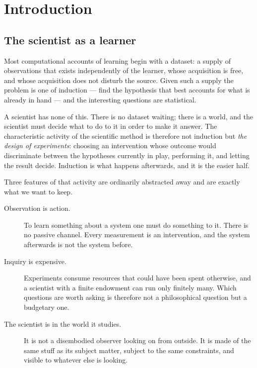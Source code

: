 \bigskip

\section{Introduction}\label{sci:S1}

\subsection{The scientist as a learner}\label{sci:S1.1}

Most computational accounts of learning begin with a dataset: a supply of observations that exists
independently of the learner, whose acquisition is free, and whose acquisition does not disturb the
source. Given such a supply the problem is one of induction --- find the hypothesis that best accounts
for what is already in hand --- and the interesting questions are statistical.

A scientist has none of this. There is no dataset waiting; there is a world, and the scientist must
decide what to do to it in order to make it answer. The characteristic activity of the scientific
method is therefore not induction but \emph{the design of experiments}: choosing an intervention whose
outcome would discriminate between the hypotheses currently in play, performing it, and letting the
result decide. Induction is what happens afterwards, and it is the easier half.

Three features of that activity are ordinarily abstracted away and are exactly what we want to keep.

\begin{description}
\item[Observation is action.] To learn something about a system one must do something to it. There is
no passive channel. Every measurement is an intervention, and the system afterwards is not the system
before.
\item[Inquiry is expensive.] Experiments consume resources that could have been spent otherwise, and a
scientist with a finite endowment can run only finitely many. Which questions are worth asking is
therefore not a philosophical question but a budgetary one.
\item[The scientist is in the world it studies.] It is not a disembodied observer looking on from
outside. It is made of the same stuff as its subject matter, subject to the same constraints, and
visible to whatever else is looking.
\end{description}

